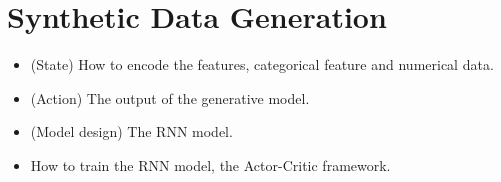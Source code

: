 \section{Synthetic Data Generation} 
\label{sec:datagen}


\begin{itemize}
	\item (State) How to encode the features, \ie categorical feature and numerical data.
	\item (Action) The output of the generative model.
	\item (Model design) The RNN model.
	\item How to train the RNN model, \ie the Actor-Critic framework.
\end{itemize}




